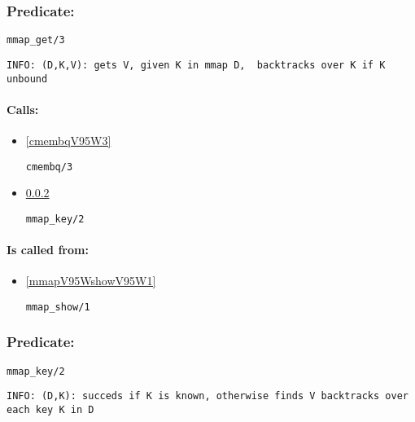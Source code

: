 \subsubsection{Predicate:} \label{mmapV95WgetV95W3}

\begin{verbatim}
mmap_get/3
\end{verbatim}

{\small \begin{verbatim}
INFO: (D,K,V): gets V, given K in mmap D,  backtracks over K if K unbound

\end{verbatim}}
\paragraph{Calls:} 
\begin{itemize}
\item \ref{cmembqV95W3} 
\begin{verbatim}
cmembq/3
\end{verbatim}

\item \ref{mmapV95WkeyV95W2} 
\begin{verbatim}
mmap_key/2
\end{verbatim}

\end{itemize}
\paragraph{Is called from:} 
\begin{itemize}
\item \ref{mmapV95WshowV95W1} 
\begin{verbatim}
mmap_show/1
\end{verbatim}

\end{itemize}

\subsubsection{Predicate:} \label{mmapV95WkeyV95W2}

\begin{verbatim}
mmap_key/2
\end{verbatim}

{\small \begin{verbatim}
INFO: (D,K): succeds if K is known, otherwise finds V backtracks over each key K in D

\end{verbatim}}
